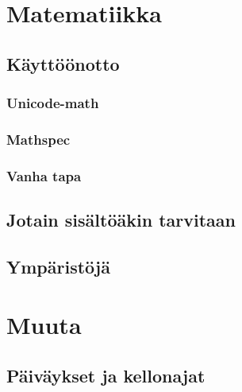 \documentclass[notitlepage,oneside]{book}
\begin{document}
\clearpage
\pagestyle{plain}







\chapter{Matematiikka}
\label{luku:matematiikka}
\section{Käyttöönotto}
\subsection{Unicode-math}
\subsection{Mathspec}
\subsection{Vanha tapa}
\section{Jotain sisältöäkin tarvitaan}
\section{Ympäristöjä}

\chapter{Muuta}
\section{Päiväykset ja kellonajat}

\printindex
\end{document}
